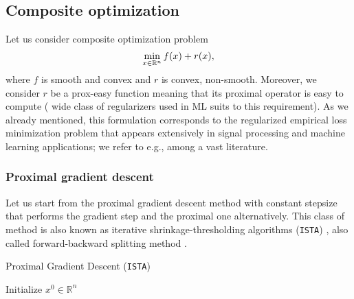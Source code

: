 \subsection{Composite optimization}\label{sec:basics_composite}
Let us consider  composite optimization problem
\begin{equation}\label{eq:pb_composite}
\min_{x\in\mathbb{R}^n} f(x) + r(x),
\end{equation}
where $f$ is smooth and convex and $r$ is convex, non-smooth. Moreover, we consider $r$  be a prox-easy function meaning that its proximal operator is easy to compute ( wide class of regularizers used in ML suits to this requirement). As we already mentioned, this formulation corresponds to the regularized empirical loss minimization problem that appears extensively in signal processing and machine learning applications; we refer to e.g.\;\cite{candes2008enhancing,combettes2011proximal,bach2012optimization}, among a vast literature.



\subsubsection{Proximal gradient descent}
Let us start from the proximal gradient descent method with constant stepsize that performs the gradient step and the proximal one alternatively. This class of method is also known as iterative shrinkage-thresholding algorithms (\texttt{ISTA}) \cite{daubechies2004iterative}, also called forward-backward splitting method \cite{gabay1983chapter, combettes2011proximal, raguet2013generalized}.

\begin{algorithm}
    \caption{Proximal Gradient Descent (\texttt{ISTA})}
    \label{algo:pgd}
    \begin{algorithmic}
        \STATE Initialize $x^0\in\mathbb{R}^n$
        \ENDFOR
    \end{algorithmic}
\end{algorithm}

